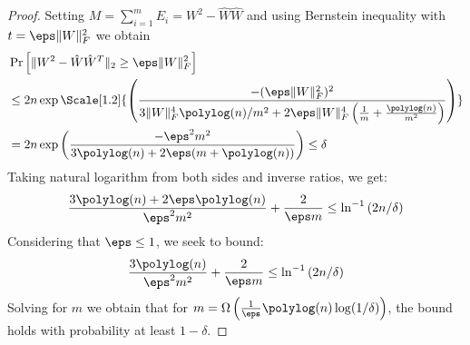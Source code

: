 \documentclass{sig-alternate}
\begin{document}
\begin{proof}
Setting $M = \sum_{i=1}^m E_i = W^2 - \hat{W}\hat{W}$ and using Bernstein inequality with $t = \eps \|W\|_F^2$ we obtain 
\begin{align*}
&\Pr \left[\|W^2-\hat W \hat{W}^T\|_2 \geq \eps \|W\|_F^2 \right] \\
&\leq 2n\exp \Scale[1.2]{\left(\frac{-(\eps \|W\|_F^2)^2}{3\|W\|_F^4  \polylog(n)/m^2 + 2\eps \|W\|_F^4 \left(\frac{1}{m} + \frac{\polylog(n)}{m^{2}} \right)} \right)}\\
& = 2n \exp \left( \frac{-\eps^2 m^2}{3 \polylog(n) + 2\eps (m + \polylog(n))} \right) \leq \delta
\end{align*}
Taking natural logarithm from both sides and inverse ratios, we get:
\[
\frac{3\polylog(n) + 2\eps \polylog(n)}{\eps^2 m^2} + \frac{2}{\eps m} \leq \ln^{-1}{(2n/\delta)}
\]
Considering that $\eps \leq 1$, we seek to bound:
\[
\frac{3 \polylog(n)}{\eps^2 m^2} + \frac{2}{\eps m} \leq \ln^{-1}{(2n/\delta)}
\]
Solving for $m$ we obtain that for $m = \Omega \left(\frac{1}{\eps}\polylog (n) \log(1/\delta) \right)$, the bound holds with probability at least $1 - \delta$.\end{proof}
\end{document}
